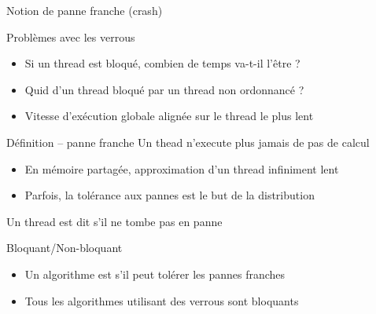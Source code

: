 
\begingroup

\begin{frame}{Notion de panne franche (crash)}

  \begin{alertblock}{Problèmes avec les verrous}
    \begin{itemize}
    \item Si un thread est bloqué, combien de temps va-t-il l'être ?
    \item Quid d'un thread bloqué par un thread non ordonnancé ?
    \item Vitesse d'exécution globale alignée sur le thread le plus lent
    \end{itemize}
  \end{alertblock}

  \begin{block}{Définition -- panne franche}
    Un thead  n'execute plus jamais de pas de calcul
    \begin{itemize}
    \item En mémoire partagée, approximation d'un thread infiniment lent
    \item Parfois, la tolérance aux pannes est le but de la distribution
    \end{itemize}
    Un thread est dit  s'il ne tombe pas en panne
  \end{block}

  
  \begin{block}{Bloquant/Non-bloquant}
    \begin{itemize}
    \item Un algorithme est  s'il peut tolérer les pannes franches
    \item Tous les algorithmes utilisant des verrous sont bloquants
    \end{itemize}
  \end{block}

\end{frame}

\endgroup
\endinput
